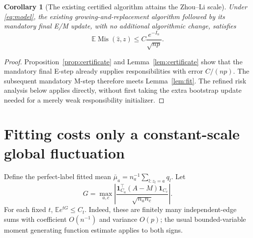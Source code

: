 \documentclass[11pt]{article}
\newtheorem{corollary}[theorem]{Corollary}
\newcommand{\E}{\mathbb E}
\newcommand{\one}{\mathbf 1}
\newcommand{\Mis}{\operatorname{Mis}}
\begin{document}
\begin{corollary}[The existing certified algorithm attains the Zhou--Li scale]\label{cor:algorithm}
Under \eqref{eq:model}, the existing growing-and-replacement algorithm followed by its mandatory final E/M update, with no additional algorithmic change, satisfies
\[
 \E\Mis(\widehat z,z)\le C\frac{e^{-I_n}}{\sqrt{np}}.
\]
\end{corollary}
\begin{proof}
Proposition~\ref{prop:certificate} and Lemma~\ref{lem:certificate} show that the mandatory final E-step already supplies responsibilities with error $C/(np)$. The subsequent mandatory M-step therefore meets Lemma~\ref{lem:fit}. The refined risk analysis below applies directly, without first taking the extra bootstrap update needed for a merely weak responsibility initializer.
\end{proof}

\section{Fitting costs only a constant-scale global fluctuation}
Define the perfect-label fitted mean $\bar\mu_a=n_a^{-1}\sum_{l:z_l=a}q_l$. Let
\[
 G=\max_{a,c}\left|\frac{\one_{C_a}^\top(A-M)\one_{C_c}}{\sqrt{n_an_c}}\right|.
\]
For each fixed $t$, $\E e^{tG}\le C_t$. Indeed, these are finitely many independent-edge sums with coefficient $O(n^{-1})$ and variance $O(p)$; the usual bounded-variable moment generating function estimate applies to both signs.
\end{document}
